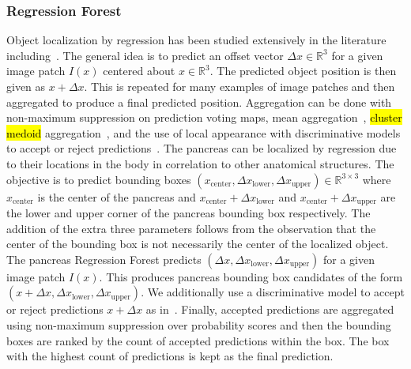\documentclass[journal]{IEEEtran}
\begin{document}
\subsubsection{Regression Forest}\label{sec:regression}
Object localization by regression has been studied extensively in the literature including~\cite{criminisi2013regression,regressionKidneys,laybirkbeck2013}. The general idea is to predict an offset vector $\Delta x \in \mathbb{R}^3$ for a given image patch $I(x)$ centered about $x \in \mathbb{R}^3$. The predicted object position is then given as $x + \Delta x$. This is repeated for many examples of image patches and then aggregated to produce a final predicted position. Aggregation can be done with non-maximum suppression on prediction voting maps, mean aggregation~\cite{criminisi2013regression}, \hl{cluster medoid} aggregation~\cite{regressionKidneys}, and the use of local appearance with discriminative models to accept or reject predictions~\cite{laybirkbeck2013}.
The pancreas can be localized by regression due to their locations in the body in correlation to other anatomical structures. The objective is to predict bounding boxes $(x_{\text{center}},\Delta x_{\text{lower}}, \Delta x_{\text{upper}}) \in \mathbb{R}^{3 \times 3}$ where $x_{\text{center}}$ is the center of the pancreas and $x_{\text{center}} + \Delta x_{\text{lower}}$ and $x_{\text{center}} + \Delta x_{\text{upper}}$ are the lower and upper corner of the pancreas bounding box respectively. The addition of the extra three parameters follows from the observation that the center of the bounding box is not necessarily the center of the localized object. The pancreas Regression Forest predicts $(\Delta x, \Delta x_{\text{lower}}, \Delta x_{\text{upper}})$ for a given image patch $I(x)$. This produces pancreas bounding box candidates of the form $(x + \Delta x, \Delta x_{\text{lower}}, \Delta x_{\text{upper}})$. We additionally use a discriminative model to accept or reject predictions $x + \Delta x$ as in~\cite{laybirkbeck2013}. Finally, accepted predictions are aggregated using non-maximum suppression over probability scores and then the bounding boxes are ranked by the count of accepted predictions within the box. The box with the highest count of predictions is kept as the final prediction. %
\end{document}
